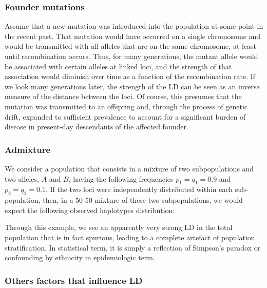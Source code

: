 \documentclass[]{book}
\begin{document}
\hypertarget{founder-mutations}{%
\subsubsection*{Founder mutations}\label{founder-mutations}}

Assume that a new mutation was introduced into the population at some
point in the recent past. That mutation would have occurred on a single
chromosome and would be transmitted with all alleles that are on the
same chromosome, at least until recombination occurs. Thus, for many
generations, the mutant allele would be associated with certain alleles
at linked loci, and the strength of that association would diminish over
time as a function of the recombination rate. If we look many
generations later, the strength of the LD can be seen as an inverse
measure of the distance between the loci. Of course, this presumes that
the mutation was transmitted to an offspring and, through the process of
genetic drift, expanded to sufficient prevalence to account for a
significant burden of disease in present-day descendants of the affected
founder.

\hypertarget{admixture}{%
\subsubsection*{Admixture}\label{admixture}}

We consider a population that consists in a mixture of two
subpopulations and two alleles, \(A\) and \(B\), having the following
frequencies \(p_1 = q_1 = 0.9\) and \(p_2 = q_2 = 0.1\). If the two loci
were independently distributed within each sub-population, then, in a
50-50 mixture of these two subpopulations, we would expect the following
observed haplotypes distribution:

Through this example, we see an apparently very strong LD in the total
population that is in fact spurious, leading to a complete artefact of
population stratification. In statistical term, it is simply a
reflection of Simpson's paradox \citep{simpson1951interpretation} or
confounding by ethnicity in epidemiologic term.

\hypertarget{others-factors-that-influence-ld}{%
\subsubsection*{Others factors that influence LD}\label{others-factors-that-influence-ld}}
\end{document}
